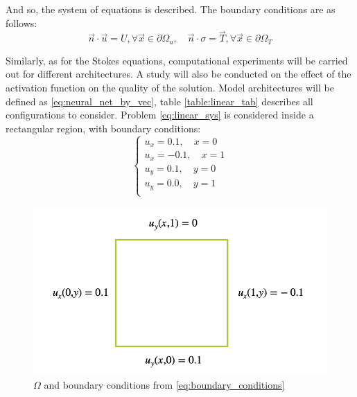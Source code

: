 And so, the system of equations is described. The boundary conditions are as follows:
\begin{equation}
	\vec{n} \cdot \vec{u} = U, \forall \vec{x} \in \partial \Omega_u, \quad \vec{n} \cdot \sigma = \vec{T}, \forall \vec{x} \in \partial \Omega_T
\end{equation}

Similarly, as for the Stokes equations, computational experiments will be carried out for different architectures. A study will also be conducted on the effect of the activation function on the quality of the solution. Model architectures will be defined as \eqref{eq:neural_net_by_vec}, table \ref{table:linear_tab} describes all configurations to consider. Problem \eqref{eq:linear_sys} is considered inside a rectangular region, with boundary conditions:
\begin{equation}
	\label{eq:boundary_conditions}
	\begin{cases}
		u_x = 0.1, \quad x = 0 \\
		u_x = -0.1, \quad x = 1 \\
		u_y = 0.1, \quad y = 0 \\
		u_y = 0.0, \quad y = 1 \\
	\end{cases}
\end{equation}

\begin{figure}
	\centering
	\includegraphics[width=\textwidth]{images/chapter3/linear_description.png}
	\caption{$\Omega$ and boundary conditions from \eqref{eq:boundary_conditions}}
	\label{fig:linear_description}\tabularnewline
\end{figure}

